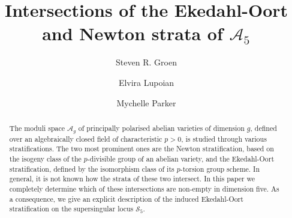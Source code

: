 \documentclass[11pt,table]{amsart}
\numberwithin{equation}{section}
\newtheorem{definition}[thm]{Definition}
\theoremstyle{definition}
\theoremstyle{remark}
\theoremstyle{remark}
\begin{document}
\title{Intersections of the Ekedahl-Oort and Newton strata of $\mathcal{A}_{5}$}

\begin{abstract}
The moduli space $\mathcal{A}_g$ of principally polarised abelian varieties of dimension $g$, defined over an algebraically closed field of characteristic $p >0$, is studied through various stratifications. The two most prominent ones are the Newton stratification, based on the isogeny class of the $p$-divisible group of an abelian variety, and the Ekedahl-Oort stratification, defined by the isomorphism class of its $p$-torsion group scheme. In general, it is not known how the strata of these two intersect. In this paper we completely determine which of these intersections are non-empty in dimension five. As a consequence, we give an explicit description of the induced Ekedahl-Oort stratification on the supersingular locus $\mathcal{S}_{5}$. 
\end{abstract}


\author{Steven R.  Groen}
 \author{Elvira Lupoian} 
 \author{Mychelle Parker}

\address{Steven Groen \\ Korteweg-de Vries Institute for Mathematics, University of Amsterdam, Amsterdam, Netherlands}

\address{Elvira Lupoian \\ Department of Mathematics, University College London, London \\ United Kingdom}

 \address{Mychelle Parker \\ Department of Mathematics, The University of Texas at Austin, Austin  \\ United States}



 
\maketitle


\end{document}
